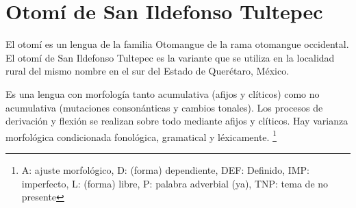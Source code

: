 \section*{Otomí de San Ildefonso Tultepec}

\noindent El otomí es un lengua de la familia Otomangue de la rama otomangue occidental. El otomí de San Ildefonso Tultepec es la variante que se utiliza en la localidad rural del mismo nombre en el sur del Estado de Querétaro, México.

Es una lengua con morfología tanto acumulativa (afijos y clíticos) como no acumulativa (mutaciones consonánticas y cambios tonales). Los procesos de derivación y flexión se realizan sobre todo mediante afijos y clíticos. Hay varianza morfológica condicionada fonológica, gramatical y léxicamente.
\footnote{A: ajuste morfológico, D: (forma) dependiente, DEF: Definido, IMP: imperfecto, L: (forma) libre, P: palabra adverbial (ya), TNP: tema de no presente}
\vspace{0.5cm}

